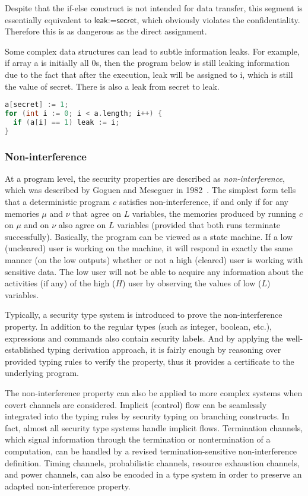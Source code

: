 Despite that the \textsf{if-else} construct is not intended for data transfer, this segment is essentially equivalent to $\textsf{leak:=secret}$, which obviously violates the confidentiality. Therefore this is as dangerous as the direct assignment.

Some complex data structures can lead to subtle information leaks. For example, if array \textsf{a} is initially all \textsf{0}s, then the program below is still leaking information due to the fact that after the execution, \textsf{leak} will be assigned to \textsf{i}, which is still the value of \textsf{secret}. There is also a leak from \textsf{secret} to \textsf{leak}.

\begin{lstlisting}[language=c,float=h]
a[secret] := 1;
for (int i := 0; i < a.length; i++) {
  if (a[i] == 1) leak := i;
}
\end{lstlisting}

\subsubsection{Non-interference}
At a program level, the security properties are described as \emph{non-interference}, which was described by Goguen and Meseguer in 1982~\cite{Goguen:1982ta}. The simplest form tells that a deterministic program $c$ satisfies non-interference, if and only if for any memories $\mu$ and $\nu$ that agree on $L$ variables, the memories produced by running $c$ on $\mu$ and on $\nu$ also agree on $L$ variables (provided that both runs terminate successfully). Basically, the program can be viewed as a state machine. If a low (uncleared) user is working on the machine, it will respond in exactly the same manner (on the low outputs) whether or not a high (cleared) user is working with sensitive data. The low user will not be able to acquire any information about the activities (if any) of the high ($H$) user by observing the values of low ($L$) variables.

Typically, a security type system is introduced to prove the non-interference property. In addition to the regular types (such as integer, boolean, etc.), expressions and commands also contain security labels. And by applying the well-established typing derivation approach, it is fairly enough by reasoning over provided typing rules to verify the property, thus it provides a certificate to the underlying program.

The non-interference property can also be applied to more complex systems when covert channels are considered. Implicit (control) flow can be seamlessly integrated into the typing rules by security typing on branching constructs. In fact, almost all security type systems handle implicit flows. Termination channels, which signal information through the termination or nontermination of a computation, can be handled by a revised termination-sensitive non-interference definition. Timing channels, probabilistic channels, resource exhaustion channels, and power channels, can also be encoded in a type system in order to preserve an adapted non-interference property.

